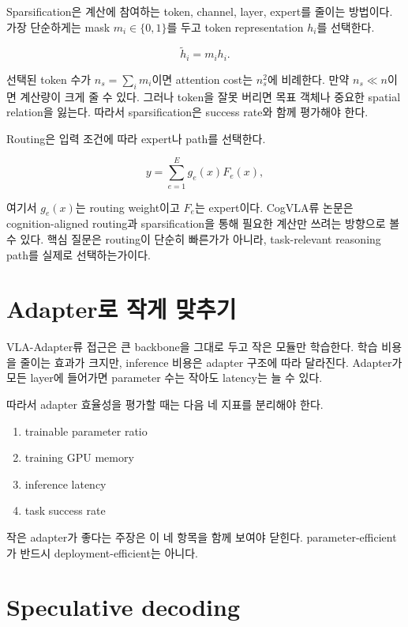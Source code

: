 Sparsification은 계산에 참여하는 token, channel, layer, expert를 줄이는 방법이다. 가장 단순하게는 mask $m_i \in \{0,1\}$를 두고 token representation $h_i$를 선택한다.

\begin{equation}
  \tilde{h}_i = m_i h_i.
\end{equation}

선택된 token 수가 $n_s = \sum_i m_i$이면 attention cost는 $n_s^2$에 비례한다. 만약 $n_s \ll n$이면 계산량이 크게 줄 수 있다. 그러나 token을 잘못 버리면 목표 객체나 중요한 spatial relation을 잃는다. 따라서 sparsification은 success rate와 함께 평가해야 한다.

Routing은 입력 조건에 따라 expert나 path를 선택한다.

\begin{equation}
  y =
  \sum_{e=1}^{E}
  g_e(x) F_e(x),
\end{equation}

여기서 $g_e(x)$는 routing weight이고 $F_e$는 expert이다. CogVLA류 논문은 cognition-aligned routing과 sparsification을 통해 필요한 계산만 쓰려는 방향으로 볼 수 있다. 핵심 질문은 routing이 단순히 빠른가가 아니라, task-relevant reasoning path를 실제로 선택하는가이다.

\section{Adapter로 작게 맞추기}

VLA-Adapter류 접근은 큰 backbone을 그대로 두고 작은 모듈만 학습한다. 학습 비용을 줄이는 효과가 크지만, inference 비용은 adapter 구조에 따라 달라진다. Adapter가 모든 layer에 들어가면 parameter 수는 작아도 latency는 늘 수 있다.

따라서 adapter 효율성을 평가할 때는 다음 네 지표를 분리해야 한다.

\begin{enumerate}
  \item trainable parameter ratio
  \item training GPU memory
  \item inference latency
  \item task success rate
\end{enumerate}

작은 adapter가 좋다는 주장은 이 네 항목을 함께 보여야 닫힌다. parameter-efficient가 반드시 deployment-efficient는 아니다.

\section{Speculative decoding}

